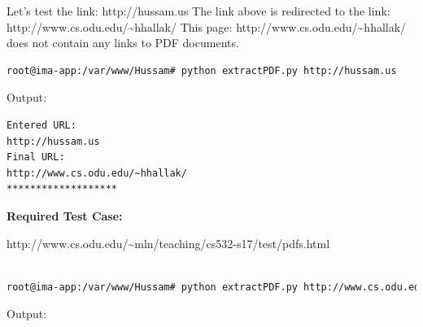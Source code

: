 \documentclass[a4paper, 11pt]{article}
\begin{document}
Let's test the link: 
\newline
http://hussam.us 
\newline
The link above is redirected to the link:
\newline
http://www.cs.odu.edu/\textasciitilde hhallak/
\newline
\noindent
This page: http://www.cs.odu.edu/\textasciitilde hhallak/ does not contain any links to PDF documents.
\begin{lstlisting}[language=bash] 
root@ima-app:/var/www/Hussam# python extractPDF.py http://hussam.us
\end{lstlisting}

Output:

\begin{lstlisting}[language=bash]
Entered URL:
http://hussam.us
Final URL:
http://www.cs.odu.edu/~hhallak/
*******************
\end{lstlisting}

\noindent
\textbf{Required Test Case:}

http://www.cs.odu.edu/\textasciitilde mln/teaching/cs532-s17/test/pdfs.html
\begin{lstlisting}[language=bash]

root@ima-app:/var/www/Hussam# python extractPDF.py http://www.cs.odu.edu/~mln/teaching/cs532-s17/test/pdfs.html

\end{lstlisting}

Output:
\end{document}
